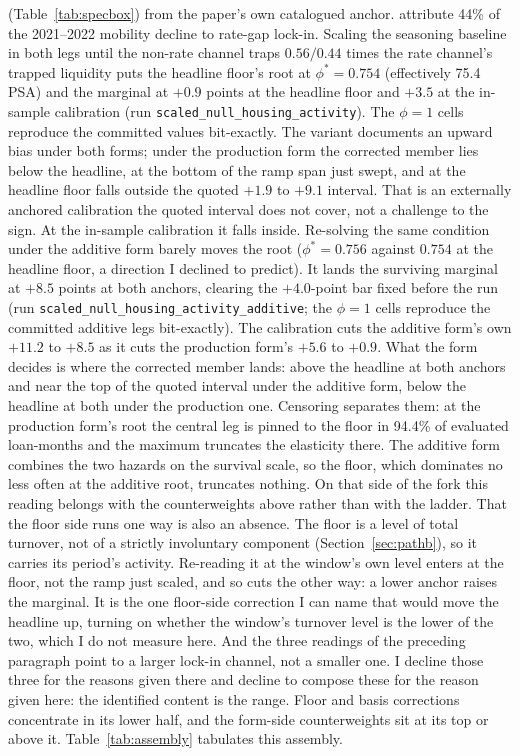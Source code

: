 \documentclass[12pt]{article}
\begin{document}
(Table~\ref{tab:specbox}) from the paper's own catalogued anchor. \citet{aladangady2024} attribute 44\% of the 2021--2022 mobility decline to rate-gap lock-in. Scaling the seasoning baseline in both legs until the non-rate channel traps $0.56/0.44$ times the rate channel's trapped liquidity puts the headline floor's root at $\phi^{*} = 0.754$ (effectively 75.4 PSA) and the marginal at $+0.9$ points at the headline floor and $+3.5$ at the in-sample calibration (run \texttt{scaled\_null\_housing\_activity}). The $\phi = 1$ cells reproduce the committed values bit-exactly. The variant documents an upward bias under both forms; under the production form the corrected member lies below the headline, at the bottom of the ramp span just swept, and at the headline floor falls outside the quoted $+1.9$ to $+9.1$ interval. That is an externally anchored calibration the quoted interval does not cover, not a challenge to the sign. At the in-sample calibration it falls inside. Re-solving the same condition under the additive form barely moves the root ($\phi^{*} = 0.756$ against $0.754$ at the headline floor, a direction I declined to predict). It lands the surviving marginal at $+8.5$ points at both anchors, clearing the $+4.0$-point bar fixed before the run (run \texttt{scaled\_null\_housing\_activity\_additive}; the $\phi = 1$ cells reproduce the committed additive legs bit-exactly). The calibration cuts the additive form's own $+11.2$ to $+8.5$ as it cuts the production form's $+5.6$ to $+0.9$. What the form decides is where the corrected member lands: above the headline at both anchors and near the top of the quoted interval under the additive form, below the headline at both under the production one. Censoring separates them: at the production form's root the central leg is pinned to the floor in 94.4\% of evaluated loan-months and the maximum truncates the elasticity there. The additive form combines the two hazards on the survival scale, so the floor, which dominates no less often at the additive root, truncates nothing. On that side of the fork this reading belongs with the counterweights above rather than with the ladder. That the floor side runs one way is also an absence. The floor is a level of total turnover, not of a strictly involuntary component (Section~\ref{sec:pathb}), so it carries its period's activity. Re-reading it at the window's own level enters at the floor, not the ramp just scaled, and so cuts the other way: a lower anchor raises the marginal. It is the one floor-side correction I can name that would move the headline up, turning on whether the window's turnover level is the lower of the two, which I do not measure here. And the three readings of the preceding paragraph point to a larger lock-in channel, not a smaller one. I decline those three for the reasons given there and decline to compose these for the reason given here: the identified content is the range. Floor and basis corrections concentrate in its lower half, and the form-side counterweights sit at its top or above it. Table~\ref{tab:assembly} tabulates this assembly.
\end{document}
